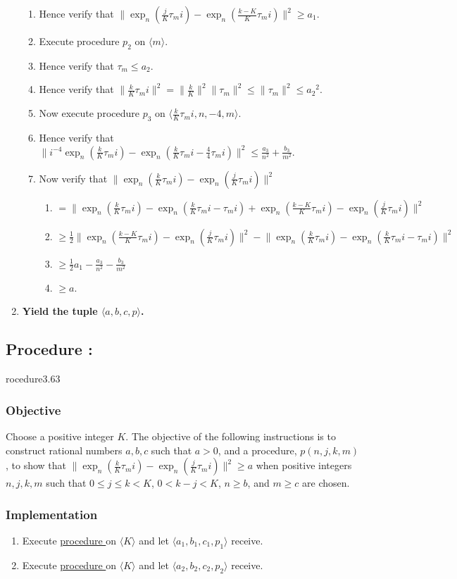 \documentclass{article}
\newcounter{procedure}[part]
\newcommand{\procedure}[1]{\subsection*{Procedure \thepart:\theprocedure}\label{sec:procedure #1}\global\expandafter\edef\csname procedure#1\endcsname{\thepart:\theprocedure}\addtocounter{procedure}{1}}
\newcommand{\objective}{\subsubsection*{Objective}}
\newcommand{\implementation}{\subsubsection*{Implementation}}
\newcommand{\procedurehr}[1]{\hyperref[sec:procedure #1]{procedure \expandafter\csname procedure#1\endcsname}}
\begin{document}
\begin{multicols}{2}
\begin{enumerate}
\begin{enumerate}
						\item Hence verify that $\lVert\exp_n(\frac{j}{K}\tau_mi)-\exp_n(\frac{k-K}{K}\tau_mi)\rVert^2\ge a_1$.
						\item Execute procedure $p_2$ on $\langle m\rangle$.
						\item Hence verify that $\tau_m\le a_2$.
						\item Hence verify that $\lVert\frac{k}{K}\tau_mi\rVert^2=\lVert\frac{k}{K}\rVert^2\lVert\tau_m\rVert^2\le\lVert\tau_m\rVert^2\le{a_2}^2$.
						\item Now execute procedure $p_3$ on $\langle\frac{k}{K}\tau_mi,n,-4,m\rangle$.
						\item Hence verify that $\lVert i^{-4}\exp_n(\frac{k}{K}\tau_mi)-\exp_n(\frac{k}{K}\tau_mi-\frac{4}{4}\tau_mi)\rVert^2\le\frac{a_3}{n^2}+\frac{b_3}{m^2}$.
						\item Now verify that $\lVert\exp_n(\frac{k}{K}\tau_mi)-\exp_n(\frac{j}{K}\tau_mi)\rVert^2$
						\begin{enumerate}
							\item $=\lVert\exp_n(\frac{k}{K}\tau_mi)-\exp_n(\frac{k}{K}\tau_mi-\tau_mi)+\exp_n(\frac{k-K}{K}\tau_mi)-\exp_n(\frac{j}{K}\tau_mi)\rVert^2$
							\item $\ge\frac{1}{2}\lVert\exp_n(\frac{k-K}{K}\tau_mi)-\exp_n(\frac{j}{K}\tau_mi)\rVert^2-\lVert\exp_n(\frac{k}{K}\tau_mi)-\exp_n(\frac{k}{K}\tau_mi-\tau_mi)\rVert^2$
							\item $\ge\frac{1}{2}a_1-\frac{a_3}{n^2}-\frac{b_3}{m^2}$
							\item $\ge a$.
						\end{enumerate}
					\end{enumerate}
					\item \textbf{Yield the tuple $\langle a,b,c,p\rangle$.}
				\end{enumerate}
		\procedure{3.63}
			\objective
				Choose a positive integer $K$. The objective of the following instructions is to construct rational numbers $a,b,c$ such that $a>0$, and a procedure, $p(n,j,k,m)$, to show that $\lVert\exp_n(\frac{k}{K}\tau_mi)-\exp_n(\frac{j}{K}\tau_mi)\rVert^2\ge a$ when positive integers $n,j,k,m$ such that $0\le j\le k<K$, $0<k-j<K$, $n\ge b$, and $m\ge c$ are chosen.
			\implementation
				\begin{enumerate}
					\item Execute \procedurehr{3.61} on $\langle K\rangle$ and let $\langle a_1,b_1,c_1,p_1\rangle$ receive.
					\item Execute \procedurehr{3.62} on $\langle K\rangle$ and let $\langle a_2,b_2,c_2,p_2\rangle$ receive.

\end{enumerate}
\end{multicols}
\end{document}
